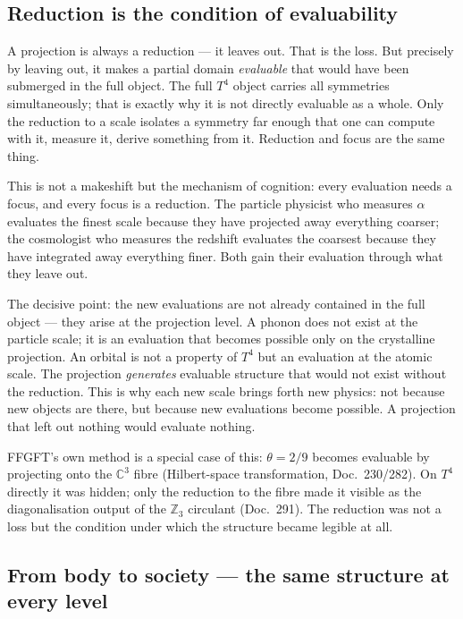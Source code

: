 \subsection*{Reduction is the condition of evaluability}

A projection is always a reduction --- it leaves out. That is the loss.
But precisely by leaving out, it makes a partial domain \emph{evaluable}
that would have been submerged in the full object. The full $T^4$ object
carries all symmetries simultaneously; that is exactly why it is not
directly evaluable as a whole. Only the reduction to a scale isolates a
symmetry far enough that one can compute with it, measure it, derive
something from it. Reduction and focus are the same thing.

This is not a makeshift but the mechanism of cognition: every evaluation
needs a focus, and every focus is a reduction. The particle physicist who
measures $\alpha$ evaluates the finest scale because they have projected
away everything coarser; the cosmologist who measures the redshift
evaluates the coarsest because they have integrated away everything finer.
Both gain their evaluation through what they leave out.

The decisive point: the new evaluations are not already contained in the
full object --- they arise at the projection level. A phonon does not exist
at the particle scale; it is an evaluation that becomes possible only on the
crystalline projection. An orbital is not a property of $T^4$ but an
evaluation at the atomic scale. The projection \emph{generates} evaluable
structure that would not exist without the reduction. This is why each new
scale brings forth new physics: not because new objects are there, but
because new evaluations become possible. A projection that left out nothing
would evaluate nothing.

FFGFT's own method is a special case of this: $\theta = 2/9$ becomes
evaluable by projecting onto the $\mathbb{C}^3$ fibre (Hilbert-space
transformation, Doc.~230/282). On $T^4$ directly it was hidden; only the
reduction to the fibre made it visible as the diagonalisation output of the
$\mathbb{Z}_3$ circulant (Doc.~291). The reduction was not a loss but the
condition under which the structure became legible at all.

\subsection*{From body to society --- the same structure at every level}

